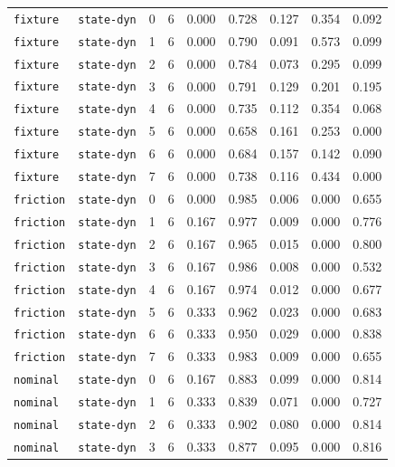 \documentclass{article}
\begin{document}
\begin{center}
\begin{tabular}{lllcccccc}
\texttt{fixture} & \texttt{state-dyn} & 0 & 6 & 0.000 & 0.728 & 0.127 & 0.354 & 0.092 \\
\texttt{fixture} & \texttt{state-dyn} & 1 & 6 & 0.000 & 0.790 & 0.091 & 0.573 & 0.099 \\
\texttt{fixture} & \texttt{state-dyn} & 2 & 6 & 0.000 & 0.784 & 0.073 & 0.295 & 0.099 \\
\texttt{fixture} & \texttt{state-dyn} & 3 & 6 & 0.000 & 0.791 & 0.129 & 0.201 & 0.195 \\
\texttt{fixture} & \texttt{state-dyn} & 4 & 6 & 0.000 & 0.735 & 0.112 & 0.354 & 0.068 \\
\texttt{fixture} & \texttt{state-dyn} & 5 & 6 & 0.000 & 0.658 & 0.161 & 0.253 & 0.000 \\
\texttt{fixture} & \texttt{state-dyn} & 6 & 6 & 0.000 & 0.684 & 0.157 & 0.142 & 0.090 \\
\texttt{fixture} & \texttt{state-dyn} & 7 & 6 & 0.000 & 0.738 & 0.116 & 0.434 & 0.000 \\
\texttt{friction} & \texttt{state-dyn} & 0 & 6 & 0.000 & 0.985 & 0.006 & 0.000 & 0.655 \\
\texttt{friction} & \texttt{state-dyn} & 1 & 6 & 0.167 & 0.977 & 0.009 & 0.000 & 0.776 \\
\texttt{friction} & \texttt{state-dyn} & 2 & 6 & 0.167 & 0.965 & 0.015 & 0.000 & 0.800 \\
\texttt{friction} & \texttt{state-dyn} & 3 & 6 & 0.167 & 0.986 & 0.008 & 0.000 & 0.532 \\
\texttt{friction} & \texttt{state-dyn} & 4 & 6 & 0.167 & 0.974 & 0.012 & 0.000 & 0.677 \\
\texttt{friction} & \texttt{state-dyn} & 5 & 6 & 0.333 & 0.962 & 0.023 & 0.000 & 0.683 \\
\texttt{friction} & \texttt{state-dyn} & 6 & 6 & 0.333 & 0.950 & 0.029 & 0.000 & 0.838 \\
\texttt{friction} & \texttt{state-dyn} & 7 & 6 & 0.333 & 0.983 & 0.009 & 0.000 & 0.655 \\
\texttt{nominal} & \texttt{state-dyn} & 0 & 6 & 0.167 & 0.883 & 0.099 & 0.000 & 0.814 \\
\texttt{nominal} & \texttt{state-dyn} & 1 & 6 & 0.333 & 0.839 & 0.071 & 0.000 & 0.727 \\
\texttt{nominal} & \texttt{state-dyn} & 2 & 6 & 0.333 & 0.902 & 0.080 & 0.000 & 0.814 \\
\texttt{nominal} & \texttt{state-dyn} & 3 & 6 & 0.333 & 0.877 & 0.095 & 0.000 & 0.816 \\
\bottomrule
\end{tabular}
\end{center}
\end{document}

